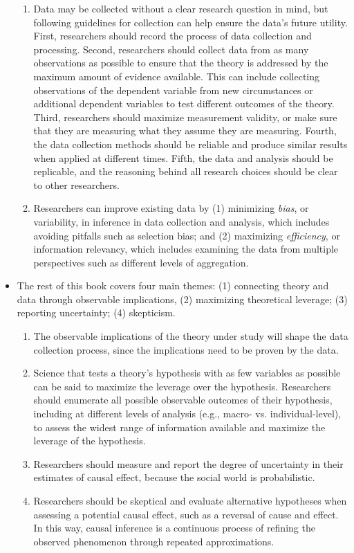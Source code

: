 \documentclass[11pt,letterpaper]{article}
\begin{document}
\begin{itemize}
\begin{enumerate}
\item Data may be collected without a clear research question in mind, but following guidelines for collection can help ensure the data's future utility. First, researchers should record the process of data collection and processing. Second, researchers should collect data from as many observations as possible to ensure that the theory is addressed by the maximum amount of evidence available. This can include collecting observations of the dependent variable from new circumstances or additional dependent variables to test different outcomes of the theory. Third, researchers should maximize measurement validity, or make sure that they are measuring what they assume they are measuring. Fourth, the data collection methods should be reliable and produce similar results when applied at different times. Fifth, the data and analysis should be replicable, and the reasoning behind all research choices should be clear to other researchers. 
\item Researchers can improve existing data by (1) minimizing \emph{bias}, or variability, in inference in data collection and analysis, which includes avoiding pitfalls such as selection bias; and (2) maximizing \emph{efficiency}, or information relevancy, which includes examining the data from multiple perspectives such as different levels of aggregation.
\end{enumerate}
\item The rest of this book covers four main themes: (1) connecting theory and data through observable implications, (2) maximizing theoretical leverage; (3) reporting uncertainty; (4) skepticism.
\begin{enumerate}
\item The observable implications of the theory under study will shape the data collection process, since the implications need to be proven by the data. 
\item Science that tests a theory's hypothesis with as few variables as possible can be said to maximize the leverage over the hypothesis. Researchers should enumerate all possible observable outcomes of their hypothesis, including at different levels of analysis (e.g., macro- vs. individual-level), to assess the widest range of information available and maximize the leverage of the hypothesis.
\item Researchers should measure and report the degree of uncertainty in their estimates of causal effect, because the social world is probabilistic.
\item Researchers should be skeptical and evaluate alternative hypotheses when assessing a potential causal effect, such as a reversal of cause and effect. In this way, causal inference is a continuous process of refining the observed phenomenon through repeated approximations.
\end{enumerate}
\end{itemize}
\end{document}
